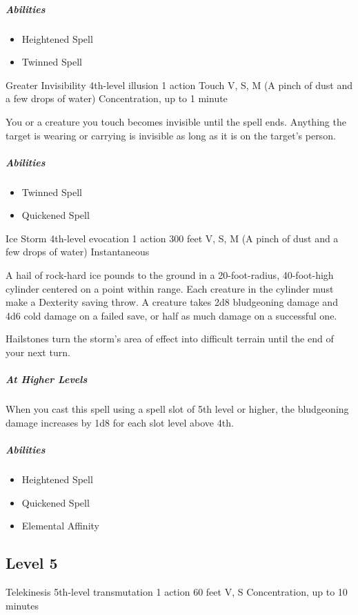 \documentclass[a4paper,openany,twocolumn]{book}
\begin{document}
\subparagraph*{Abilities}
\begin{itemize}
  \item Heightened Spell
  \item Twinned Spell
\end{itemize}

\DndSpellHeader
  {Greater Invisibility}
  {4th-level illusion}
  {1 action}
  {Touch}
  {V, S, M (A pinch of dust and a few drops of water)}
  {Concentration, up to 1 minute}

You or a creature you touch becomes invisible until the spell ends. Anything the target is wearing or carrying is invisible as long as it is on the target's person.

\subparagraph*{Abilities}
\begin{itemize}
  \item Twinned Spell
  \item Quickened Spell
\end{itemize}

\DndSpellHeader
  {Ice Storm}
  {4th-level evocation}
  {1 action}
  {300 feet}
  {V, S, M (A pinch of dust and a few drops of water)}
  {Instantaneous}

A hail of rock-hard ice pounds to the ground in a 20-foot-radius, 40-foot-high cylinder centered on a point within range.  Each creature in the cylinder must make a Dexterity saving throw. A creature takes 2d8 bludgeoning damage and 4d6 cold damage on a failed save, or half as much damage on a successful one.
    
Hailstones turn the storm's area of effect into difficult terrain until the end  of your next turn.
    
\subparagraph*{At Higher Levels} When you cast this spell using a spell slot of 5th level or higher, the bludgeoning damage increases by 1d8 for each slot level above 4th.

\subparagraph*{Abilities}
\begin{itemize}
  \item Heightened Spell
  \item Quickened Spell
  \item Elemental Affinity
\end{itemize}


\subsection*{Level 5}

\DndSpellHeader
  {Telekinesis}
  {5th-level transmutation}
  {1 action}
  {60 feet}
  {V, S}
  {Concentration, up to 10 minutes}
\end{document}
